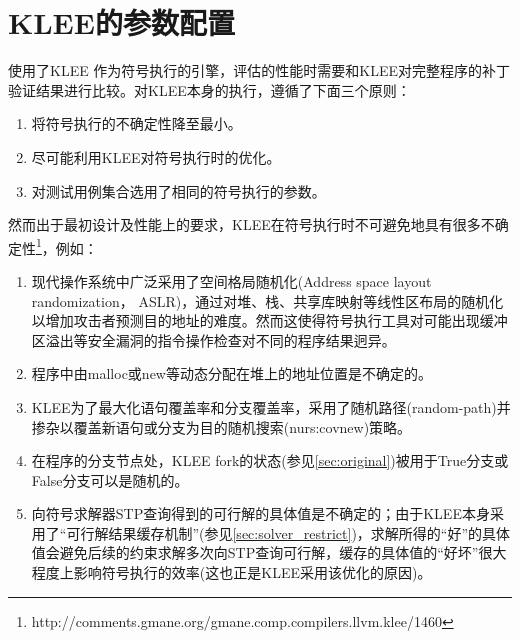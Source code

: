 \chapter{KLEE的参数配置}
\label{chap:klee_exe}

\dryrun 使用了KLEE 作为符号执行的引擎，评估\dryrun 的性能时需要和KLEE对完整程序的补丁验证结果进行比较。对KLEE本身的执行，遵循了下面三个原则：
\begin{enumerate}
\item 将符号执行的不确定性降至最小。
\item 尽可能利用KLEE对符号执行时的优化。
\item 对测试用例集合选用了相同的符号执行的参数。
\end{enumerate}

然而出于最初设计及性能上的要求，KLEE在符号执行时不可避免地具有很多不确定性\footnote{http://comments.gmane.org/gmane.comp.compilers.llvm.klee/1460}，例如：
\begin{enumerate}
\item 现代操作系统中广泛采用了空间格局随机化(Address space layout randomization， ASLR)，通过对堆、栈、共享库映射等线性区布局的随机化以增加攻击者预测目的地址的难度。然而这使得符号执行工具对可能出现缓冲区溢出等安全漏洞的指令操作检查对不同的程序结果迥异。
\item 程序中由malloc或new等动态分配在堆上的地址位置是不确定的。
\item KLEE为了最大化语句覆盖率和分支覆盖率，采用了随机路径(random-path)并掺杂以覆盖新语句或分支为目的随机搜索(nurs:covnew)策略。
\item 在程序的分支节点处，KLEE fork的状态(参见\autoref{sec:original})被用于True分支或False分支可以是随机的。
\item 向符号求解器STP查询得到的可行解的具体值是不确定的；由于KLEE本身采用了“可行解结果缓存机制”(参见\autoref{sec:solver_restrict})，求解所得的“好”的具体值会避免后续的约束求解多次向STP查询可行解，缓存的具体值的“好坏”很大程度上影响符号执行的效率(这也正是KLEE采用该优化的原因)。
\end{enumerate}


